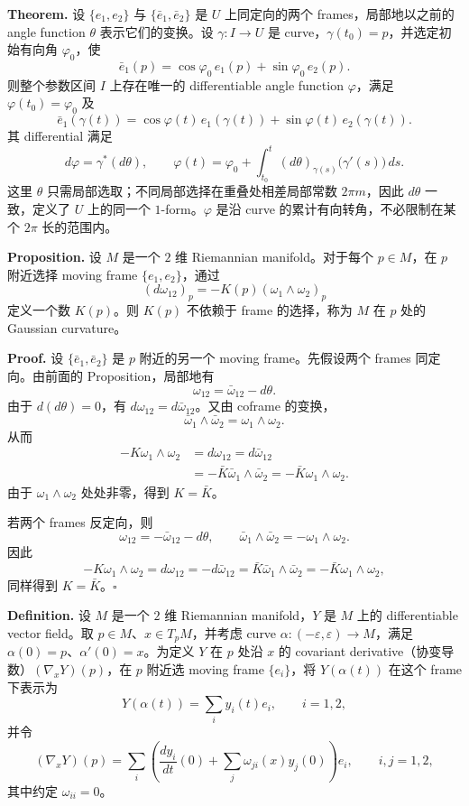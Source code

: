 \documentclass[UTF8,11pt,a4paper]{ctexart}
\begin{document}
\textbf{Theorem.} 设 $\{e_1,e_2\}$ 与 $\{\bar e_1,\bar e_2\}$ 是 $U$ 上同定向的两个 frames，局部地以之前的 angle function $\theta$ 表示它们的变换。设 $\gamma\colon I\to U$ 是 curve，$\gamma(t_0)=p$，并选定初始有向角 $\varphi_0$，使
\[
\bar e_1(p)=\cos\varphi_0\,e_1(p)+\sin\varphi_0\,e_2(p).
\]
则整个参数区间 $I$ 上存在唯一的 differentiable angle function $\varphi$，满足 $\varphi(t_0)=\varphi_0$ 及
\[
\bar e_1(\gamma(t))
=\cos\varphi(t)\,e_1(\gamma(t))
+\sin\varphi(t)\,e_2(\gamma(t)).
\]
其 differential 满足
\[
d\varphi=\gamma^*(d\theta),
\qquad
\varphi(t)=\varphi_0+\int_{t_0}^{t}
(d\theta)_{\gamma(s)}\bigl(\gamma'(s)\bigr)\,ds.
\]
这里 $\theta$ 只需局部选取；不同局部选择在重叠处相差局部常数 $2\pi m$，因此 $d\theta$ 一致，定义了 $U$ 上的同一个 $1$-form。$\varphi$ 是沿 curve 的累计有向转角，不必限制在某个 $2\pi$ 长的范围内。

\textbf{Proposition.} 设 $M$ 是一个 $2$ 维 Riemannian manifold。对于每个 $p\in M$，在 $p$ 附近选择 moving frame $\{e_1,e_2\}$，通过
\[
(d\omega_{12})_p=-K(p)(\omega_1\wedge\omega_2)_p
\]
定义一个数 $K(p)$。则 $K(p)$ 不依赖于 frame 的选择，称为 $M$ 在 $p$ 处的 Gaussian curvature。

\textbf{Proof.} 设 $\{\bar e_1,\bar e_2\}$ 是 $p$ 附近的另一个 moving frame。先假设两个 frames 同定向。由前面的 Proposition，局部地有
\[
\omega_{12}=\bar\omega_{12}-d\theta.
\]
由于 $d(d\theta)=0$，有 $d\omega_{12}=d\bar\omega_{12}$。又由 coframe 的变换，
\[
\bar\omega_1\wedge\bar\omega_2=\omega_1\wedge\omega_2.
\]
从而
\begin{align*}
-K\omega_1\wedge\omega_2
&=d\omega_{12}=d\bar\omega_{12}\\
&=-\bar K\bar\omega_1\wedge\bar\omega_2
=-\bar K\omega_1\wedge\omega_2.
\end{align*}
由于 $\omega_1\wedge\omega_2$ 处处非零，得到 $K=\bar K$。

若两个 frames 反定向，则
\[
\omega_{12}=-\bar\omega_{12}-d\theta,
\qquad
\bar\omega_1\wedge\bar\omega_2=-\omega_1\wedge\omega_2.
\]
因此
\[
-K\omega_1\wedge\omega_2
=d\omega_{12}=-d\bar\omega_{12}
=\bar K\bar\omega_1\wedge\bar\omega_2
=-\bar K\omega_1\wedge\omega_2,
\]
同样得到 $K=\bar K$。\hfill$\square$

\medskip
\textbf{Definition.} 设 $M$ 是一个 $2$ 维 Riemannian manifold，$Y$ 是 $M$ 上的 differentiable vector field。取 $p\in M$、$x\in T_pM$，并考虑 curve $\alpha\colon(-\varepsilon,\varepsilon)\to M$，满足 $\alpha(0)=p$、$\alpha'(0)=x$。为定义 $Y$ 在 $p$ 处沿 $x$ 的 covariant derivative（协变导数）$(\nabla_xY)(p)$，在 $p$ 附近选 moving frame $\{e_i\}$，将 $Y(\alpha(t))$ 在这个 frame 下表示为
\[
Y(\alpha(t))=\sum_i y_i(t)e_i,\qquad i=1,2,
\]
并令
\[
(\nabla_xY)(p)
=\sum_i\left(
\frac{dy_i}{dt}(0)+\sum_j\omega_{ji}(x)y_j(0)
\right)e_i,
\qquad i,j=1,2,
\]
其中约定 $\omega_{ii}=0$。
\end{document}
